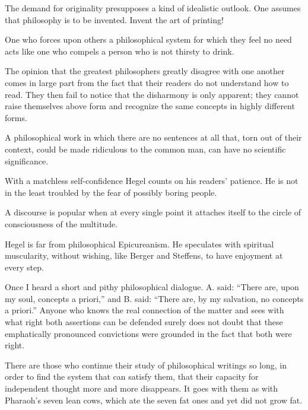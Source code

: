 \documentclass[12pt,a4paper]{article}
\newcommand{\opage}[1]{\marginnote{\footnotesize\textit{[#1]}}}
\newcommand{\aphsep}{\par\smallskip\centerline{\textasteriskcentered}\smallskip}
\begin{document}
\aphsep

The demand for originality presupposes a kind of idealistic outlook. One assumes
that philosophy is to be invented. Invent the art of printing!

\aphsep

One who forces upon others a philosophical system for which they feel no need
acts like one who compels a person who is not thirsty to drink.

\aphsep

The opinion that the greatest philosophers greatly disagree with one another
comes in large part from the fact that their readers do not understand how to
read. They then fail to notice that the disharmony is only apparent; they cannot
raise themselves above form and recognize the same concepts in highly different
forms.

\aphsep

\opage{23}A philosophical work in which there are no sentences at all that, torn
out of their context, could be made ridiculous to the common man, can have no
scientific significance.

\aphsep

With a matchless self-confidence Hegel counts on his readers' patience. He is not
in the least troubled by the fear of possibly boring people.

\aphsep

A discourse is popular when at every single point it attaches itself to the
circle of consciousness of the multitude.

\aphsep

Hegel is far from philosophical Epicureanism. He speculates with spiritual
muscularity, without wishing, like Berger and Steffens, to have enjoyment at
every step.

\aphsep

Once I heard a short and pithy philosophical dialogue. A. said: ``There are, upon
my soul, concepts a priori,'' and B. said: ``There are, by my salvation, no
concepts a priori.'' Anyone who knows the real connection of the matter and sees
with what right both assertions can be defended surely does not doubt that these
emphatically pronounced convictions were grounded in the fact that both were
right.

\aphsep

There are those who continue their study of philosophical writings so long, in
order to find the system that can satisfy them, that their capacity for
independent thought more and more disappears. It goes with them as with
Pharaoh's seven lean cows, which ate the seven fat ones and yet did not grow fat.
\end{document}
